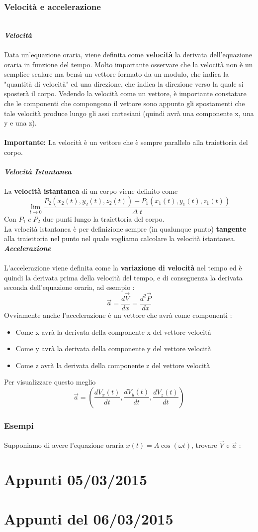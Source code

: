\documentclass[fontsize = 20px, paper = a4]{article}
\begin{document}
\subsubsection{Velocità e accelerazione}
\hspace*{1cm} \\
\textbf{\textit{Velocità}} \\ \\ 
Data un'equazione oraria, viene definita come \textbf{velocità} la derivata dell'equazione oraria in funzione del tempo.
Molto importante osservare che la velocità non è un semplice scalare ma bensì un vettore formato da un modulo, che indica la "quantità di velocità" ed una direzione, che indica la direzione verso la quale si sposterà il corpo. Vedendo la velocità come un vettore, è importante constatare che le componenti che compongono il vettore sono appunto gli spostamenti che tale velocità produce lungo gli assi cartesiani (quindi avrà una componente x, una y e una z). \\ \\
\textbf{Importante: } La velocità è un vettore che è sempre parallelo alla traiettoria del corpo. \\ \\
\textbf{\textit{Velocità Istantanea}} \\ \\ 
La \textbf{velocità istantanea} di un corpo viene definito come 
$$\lim_{t \to 0} \frac{P_2(x_2(t),y_2(t),z_2(t)) - P_1(x_1(t),y_1(t),z_1(t))}{\Delta \; t}$$
Con $P_1 \; e \; P_2$ due punti lungo la traiettoria del corpo. \\ 
La velocità istantanea è per definizione sempre (in qualunque punto) \textbf{tangente} alla traiettoria nel punto nel quale vogliamo calcolare la velocità istantanea. \newpage
\textbf{\textit{Accelerazione}} \\ \\ 
L'accelerazione viene definita come la \textbf{variazione di velocità} nel tempo ed è quindi la derivata prima della velocità del tempo, e di conseguenza la derivata seconda dell'equazione oraria, ad esempio :
$$\overrightarrow{a} = \frac{d\overrightarrow{V}}{dx} = \frac{d^2 \overrightarrow{P}}{dx}$$
Ovviamente anche l'accelerazione è un vettore che avrà come componenti : 
\begin{itemize}
\item Come  x avrà la derivata della componente x del vettore velocità
\item Come  y avrà la derivata della componente y del vettore velocità
\item Come  z avrà la derivata della componente z del vettore velocità
\end{itemize}
Per visualizzare questo meglio 
$$\overrightarrow{a} = (\frac{dV_x(t)}{dt},\frac{dV_y(t)}{dt},\frac{dV_z(t)}{dt})$$
\subsubsection{Esempi}
Supponiamo di avere l'equazione oraria $x(t) = A\cos(\omega t)$, trovare $\overrightarrow{V}$ e $\overrightarrow{a}$ :
\section{Appunti 05/03/2015}
\section{Appunti del 06/03/2015}
\end{document}
